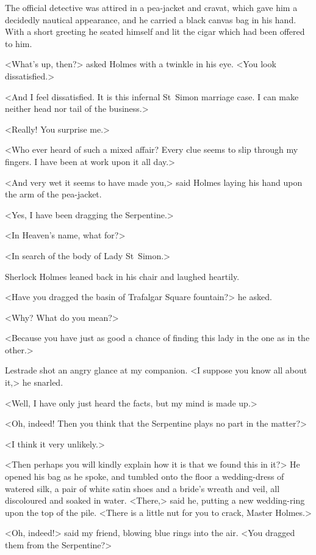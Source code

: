 The official detective was attired in a pea-jacket and cravat, which gave him a decidedly nautical appearance, and he carried a black canvas bag in his hand. With a short greeting he seated himself and lit the cigar which had been offered to him.

<What's up, then?> asked Holmes with a twinkle in his eye. <You look dissatisfied.>

<And I feel dissatisfied. It is this infernal St~Simon marriage case. I can make neither head nor tail of the business.>

<Really! You surprise me.>

<Who ever heard of such a mixed affair? Every clue seems to slip through my fingers. I have been at work upon it all day.>

<And very wet it seems to have made you,> said Holmes laying his hand upon the arm of the pea-jacket.

<Yes, I have been dragging the Serpentine.>

<In Heaven's name, what for?>

<In search of the body of Lady St~Simon.>

Sherlock Holmes leaned back in his chair and laughed heartily.

<Have you dragged the basin of Trafalgar Square fountain?> he asked.

<Why? What do you mean?>

<Because you have just as good a chance of finding this lady in the one as in the other.>

Lestrade shot an angry glance at my companion. <I suppose you know all about it,> he snarled.

<Well, I have only just heard the facts, but my mind is made up.>

<Oh, indeed! Then you think that the Serpentine plays no part in the matter?>

<I think it very unlikely.>

<Then perhaps you will kindly explain how it is that we found this in it?> He opened his bag as he spoke, and tumbled onto the floor a wedding-dress of watered silk, a pair of white satin shoes and a bride's wreath and veil, all discoloured and soaked in water. <There,> said he, putting a new wedding-ring upon the top of the pile. <There is a little nut for you to crack, Master Holmes.>

<Oh, indeed!> said my friend, blowing blue rings into the air. <You dragged them from the Serpentine?>

